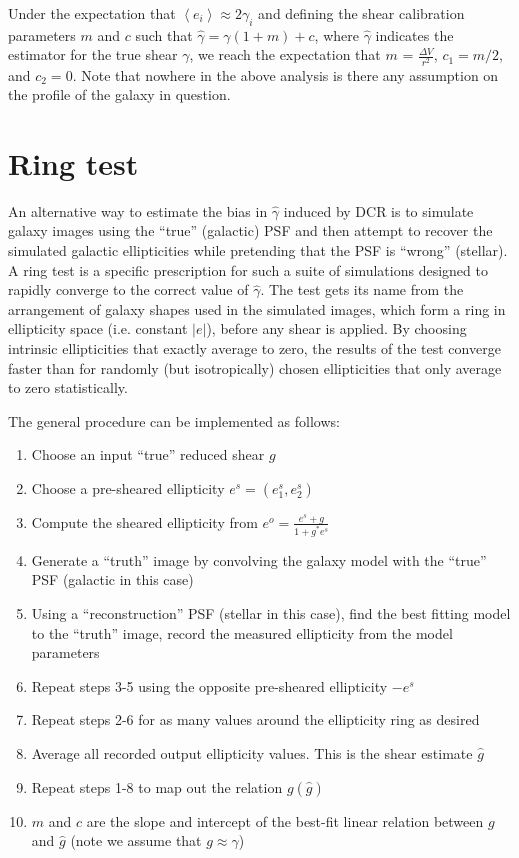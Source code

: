 \documentclass[apj]{emulateapj}
\begin{document}
Under the expectation that $\left<e_i\right> \approx 2\gamma_i$ and
defining the shear calibration parameters $m$ and $c$ such that
$\hat{\gamma} = \gamma (1 + m) + c$, where $\hat{\gamma}$ indicates
the estimator for the true shear $\gamma$, we reach the expectation
that $m$ = $\frac{\Delta V}{r^2}$, $c_1 = m/2$, and $c_2 = 0$.  Note
that nowhere in the above analysis is there any assumption on the
profile of the galaxy in question.

\section{Ring test}\label{sec:ringtest}
An alternative way to estimate the bias in $\hat{\gamma}$ induced by
DCR is to simulate galaxy images using the ``true'' (galactic) PSF and
then attempt to recover the simulated galactic ellipticities while
pretending that the PSF is ``wrong'' (stellar).  A ring test
\citep{Nakajima2007} is a specific prescription for such a suite of
simulations designed to rapidly converge to the correct value of
$\hat{\gamma}$.  The test gets its name from the arrangement of galaxy
shapes used in the simulated images, which form a ring in ellipticity
space (i.e. constant $|e|$), before any shear is applied.  By choosing
intrinsic ellipticities that exactly average to zero, the results of
the test converge faster than for randomly (but isotropically) chosen
ellipticities that only average to zero statistically.

The general procedure can be implemented as follows:

\begin{enumerate}
  \item Choose an input ``true'' reduced shear $g$
  \item Choose a pre-sheared ellipticity $e^s = (e_1^s, e_2^s)$
  \item Compute the sheared ellipticity from $e^o = \frac{e^s+g}{1+g^*e^s}$
  \item Generate a ``truth'' image by convolving the galaxy model with
    the ``true'' PSF (galactic in this case)
  \item Using a ``reconstruction'' PSF (stellar in this case), find
    the best fitting model to the ``truth'' image, record the measured
    ellipticity from the model parameters
  \item Repeat steps 3-5 using the opposite pre-sheared ellipticity
    $-e^s$
  \item Repeat steps 2-6 for as many values around the ellipticity
    ring as desired
  \item Average all recorded output ellipticity values.  This is the
    shear estimate $\hat{g}$
  \item Repeat steps 1-8 to map out the relation $g(\hat{g})$
  \item $m$ and $c$ are the slope and intercept of the best-fit linear
    relation between $g$ and $\hat{g}$ (note we assume that $g \approx
    \gamma$)
\end{enumerate}
\end{document}
